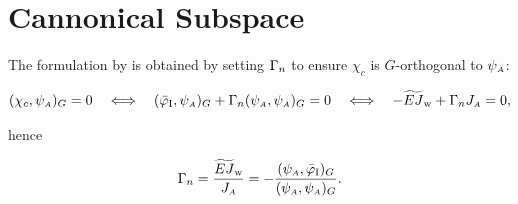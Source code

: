 









\section{Cannonical Subspace}
\label{sec:nonuniform-canonical}

The formulation by \cite{armero2021modeling} is obtained by 
setting \(\Gamma_{n}\) to ensure \(\chi_c\) is \(G\)-orthogonal
to \(\psi_{\scriptscriptstyle{A}}\):

\[
(\chi_c,\psi_{\scriptscriptstyle{A}})_G=0
\quad\Longleftrightarrow\quad
(\bar{\varphi}_{\rm I},\psi_{\scriptscriptstyle{A}})_G
+\Gamma_{n} (\psi_{\scriptscriptstyle{A}},\psi_{\scriptscriptstyle{A}})_G=0
\quad\Longleftrightarrow\quad
-\widetilde{EJ}_{\mathrm{w}}+\Gamma_{n} J_{\scriptscriptstyle{A}}=0,
\]

hence

\begin{equation}
\Gamma_{n}=\frac{\widetilde{EJ}_{\mathrm{w}}}{J_{\scriptscriptstyle{A}}}
= -\frac{(\psi_{\scriptscriptstyle{A}},\bar{\varphi}_{\rm I})_G}{(\psi_{\scriptscriptstyle{A}},\psi_{\scriptscriptstyle{A}})_G}.
\label{eq:fa-lambda}
\end{equation}


